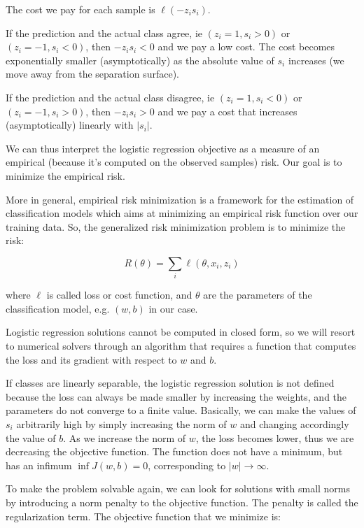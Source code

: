 The cost we pay for each sample is $\ell(-z_i s_i)$.

If the prediction and the actual class agree, ie $(z_i = 1, s_i > 0)$ or $(z_i = -1, s_i < 0)$, then $-z_i s_i < 0$ and we pay a low cost. The cost becomes exponentially smaller (asymptotically) as the absolute value of $s_i$ increases (we move away from the separation surface).

If the prediction and the actual class disagree, ie $(z_i = 1, s_i < 0)$ or $(z_i = -1, s_i > 0)$, then $-z_i s_i > 0$ and we pay a cost that increases (asymptotically) linearly with $|s_i|$.

We can thus interpret the logistic regression objective as a measure of an empirical (because it's computed on the observed samples) risk. Our goal is to minimize the empirical risk.

More in general, empirical risk minimization is a framework for the estimation of classification models which aims at minimizing an empirical risk function over our training data. So, the generalized risk minimization problem is to minimize the risk:


\begin{equation*}
R(\theta) = \sum_i \ell(\theta, x_i, z_i)
\end{equation*}

where $\ell$ is called loss or cost function, and $\theta$ are the parameters of the classification model, e.g. $(w, b)$ in our case.

Logistic regression solutions cannot be computed in closed form, so we will resort to numerical solvers through an algorithm that requires a function that computes the loss and its gradient with respect to $w$ and $b$.

If classes are linearly separable, the logistic regression solution is not defined because the loss can always be made smaller by increasing the weights, and the parameters do not converge to a finite value. Basically, we can make the values of $s_i$ arbitrarily high by simply increasing the norm of $w$ and changing accordingly the value of $b$. As we increase the norm of $w$, the loss becomes lower, thus we are decreasing the objective function. The function does not have a minimum, but has an infimum $\inf J(w, b) = 0$, corresponding to $|w| \to \infty$.

To make the problem solvable again, we can look for solutions with small norms by introducing a norm penalty to the objective function. The penalty is called the regularization term. The objective function that we minimize is:


